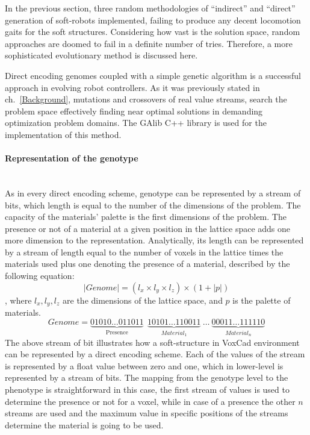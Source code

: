 In the previous section, three random methodologies of ``indirect'' and ``direct'' generation of soft-robots implemented, failing to produce any decent locomotion gaits for the soft structures. Considering how vast is the solution space, random approaches are doomed to fail in a definite number of tries. Therefore, a more sophisticated evolutionary method is discussed here.

Direct encoding genomes coupled with a simple genetic algorithm is a successful approach in evolving robot controllers. As it was previously stated in ch.~\ref{Background}, mutations and crossovers of real value streams, search the problem space effectively finding near optimal solutions in demanding optimization problem domains. The GAlib C++ library \citep{wall1996galib} is used for the implementation of this method.

\paragraph*{Representation of the genotype}~\\
As in every direct encoding scheme, genotype can be represented by a stream of bits, which length is equal to the number of the dimensions of the problem. The capacity of the materials' palette is the first dimensions of the problem. The presence or not of a material at a given position in the lattice space adds one more dimension to the representation. Analytically, its length can be represented by a stream of length equal to the number of voxels in the lattice times the materials used plus one denoting the presence of a material, described by the following equation:
\begin{equation}
\label{lengthDirect}
| Genome | = (l_x \times l_y \times l_z ) \times (1 + |p|)
\end{equation}
, where $l_x, l_y, l_z$ are the dimensions of the lattice space, and $p$ is the palette of materials.
\begin{equation*}
Genome = \underbrace{01010\ldots011011}_\text{Presence}\ \    \underbrace{10101\ldots110011}_{Material_1} \   \ldots\  \underbrace{00011\ldots111110}_{Material_n}
\end{equation*}
The above stream of bit illustrates how a soft-structure in VoxCad environment can be represented by a direct encoding scheme. Each of the values of the stream is represented by a float value between zero and one, which in lower-level is represented by a stream of bits. The mapping from the genotype level to the phenotype is straightforward in this case, the first stream of values is used to determine the presence or not for a voxel, while in case of a presence the other $n$ streams are used and the maximum value in specific positions of the streams determine the material is going to be used.

